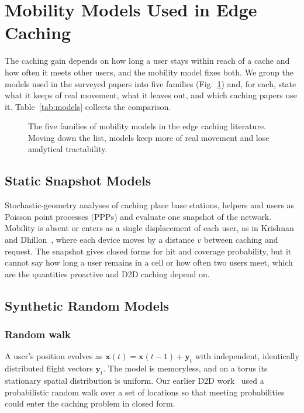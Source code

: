 
\section{Mobility Models Used in Edge Caching}
\label{sec:models}

The caching gain depends on how long a user stays within reach of a cache and how often it meets other users, and the mobility model fixes both. We group the models used in the surveyed papers into five families (Fig.~\ref{fig:taxonomy}) and, for each, state what it keeps of real movement, what it leaves out, and which caching papers use it. Table~\ref{tab:models} collects the comparison.

\begin{figure}[t]
\centering

\caption{The five families of mobility models in the edge caching literature. Moving down the list, models keep more of real movement and lose analytical tractability.}
\label{fig:taxonomy}
\end{figure}

\subsection{Static Snapshot Models}
\label{subsec:static}

Stochastic-geometry analyses of caching place base stations, helpers and users as Poisson point processes (PPPs) and evaluate one snapshot of the network. Mobility is absent or enters as a single displacement of each user, as in Krishnan and Dhillon~\cite{krishnan2017mobility}, where each device moves by a distance $v$ between caching and request. The snapshot gives closed forms for hit and coverage probability, but it cannot say how long a user remains in a cell or how often two users meet, which are the quantities proactive and D2D caching depend on.

\subsection{Synthetic Random Models}
\label{subsec:synthetic}

\subsubsection{Random walk}
A user's position evolves as $\mathbf{x}(t)=\mathbf{x}(t-1)+\mathbf{y}_t$ with independent, identically distributed flight vectors $\mathbf{y}_t$. The model is memoryless, and on a torus its stationary spatial distribution is uniform. Our earlier D2D work~\cite{hosny2019performance} used a probabilistic random walk over a set of locations so that meeting probabilities could enter the caching problem in closed form.

